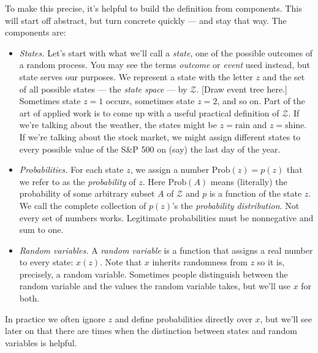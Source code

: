 \documentclass[11pt]{article}
\begin{document}
To make this precise, it's helpful to build the definition
from components.
This will start off abstract, but turn concrete quickly --- and stay that way.
The components are:
%
\begin{itemize}
\item {\it States.\/}  Let's start with what we'll call a {\it state\/},
one of the possible outcomes of a random process.
You may see the terms {\it outcome\/} or {\it event} used instead,
but state serves our purposes.
We represent a state with the letter $z$
and the set of all possible states --- the {\it state space\/} --- by $\mathcal{Z}$.
[Draw event tree here.]
Sometimes state $z=1$ occurs, sometimes state $z=2$, and so on.
Part of the art of applied work is to come up with
a useful practical definition of $\mathcal{Z}$.
If we're talking about the weather, the states might be
$z = \mbox{rain}$ and $z = \mbox{shine}$.
If we're talking about the stock market, we might assign different states to every possible value
of the S\&P 500 on (say) the last day of the year.

\item {\it Probabilities.\/}
For each state $z$, we assign a number $\mbox{Prob}(z) = p(z)$
that we refer to as the {\it probability\/} of $z$.
Here $\mbox{Prob}(A)$ means (literally) the probability of
some arbitrary subset $A$ of $\mathcal{Z}$
and $p$ is a function of the state $z$.
We call the complete collection of $p(z)$'s
the {\it probability distribution\/}.
Not every set of numbers works.
Legitimate probabilities must be nonnegative and sum to one.

\item {\it Random variables.\/}
A {\it random variable\/} is a function that
assigns a real number to every state:  $x(z)$.
Note that $x$ inherits randomness from $z$ so it is, precisely,
a random variable.
Sometimes people distinguish between the random variable
and the values the random variable takes,
but we'll use $x$ for both.
\end{itemize}
%
In practice we often ignore $z$
and define probabilities directly over $x$,
but we'll see later on that there are times when the distinction
between states and random variables is helpful.
\end{document}
